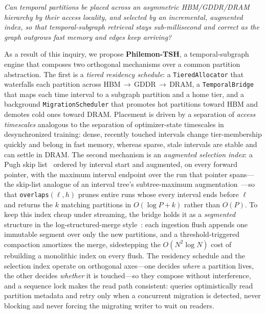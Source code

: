 \documentclass[10pt]{article}
\theoremstyle{definition}
\begin{document}
\begin{center}
\emph{Can temporal partitions be placed across an asymmetric HBM/GDDR/DRAM
hierarchy by their access locality, and selected by an incremental, augmented
index, so that temporal-subgraph retrieval stays sub-millisecond and correct as
the graph outgrows fast memory and edges keep arriving?}
\end{center}

As a result of this inquiry, we propose \textbf{Philemon-TSH}, a temporal-subgraph
engine that composes two orthogonal mechanisms over a common partition abstraction.
The first is a \emph{tiered residency schedule}: a \texttt{TieredAllocator} that
waterfalls each partition across HBM\,$\rightarrow$\,GDDR\,$\rightarrow$\,DRAM, a
\texttt{TemporalBridge} that maps each time interval to a subgraph partition and a
home tier, and a background \texttt{MigrationScheduler} that promotes hot
partitions toward HBM and demotes cold ones toward DRAM. Placement is driven by a
separation of \emph{access timescales} analogous to the separation of
optimizer-state timescales in desynchronized training: dense, recently touched
intervals change tier-membership quickly and belong in fast memory, whereas
sparse, stale intervals are stable and can settle in DRAM. The second mechanism is
an \emph{augmented selection index}: a Pugh skip list~\citep{pugh1990skiplists}
ordered by interval start and augmented, on every forward pointer, with the
maximum interval endpoint over the run that pointer spans---the skip-list analogue
of an interval tree's subtree-maximum augmentation~\citep[\S14.3]{clrs2009}---so
that \texttt{overlaps}$(\ell,h)$ prunes entire runs whose every interval ends
before $\ell$ and returns the $k$ matching partitions in $O(\log P + k)$ rather
than $O(P)$. To keep this index cheap under streaming, the bridge holds it as a
\emph{segmented} structure in the log-structured-merge style~\citep{oneil1996lsm}:
each ingestion flush appends one immutable segment over only the new partitions,
and a threshold-triggered compaction amortizes the merge, sidestepping the
$O(N^2\log N)$ cost of rebuilding a monolithic index on every flush. The residency
schedule and the selection index operate on orthogonal axes---one decides
\emph{where} a partition lives, the other decides \emph{whether} it is touched---so
they compose without interference, and a sequence lock makes the read path
consistent: queries optimistically read partition metadata and retry only when a
concurrent migration is detected, never blocking and never forcing the migrating
writer to wait on readers.
\end{document}
